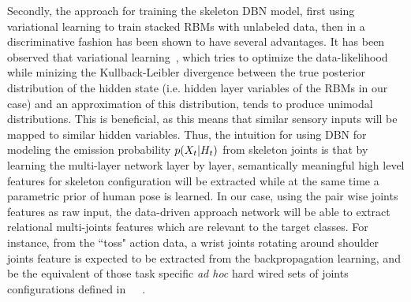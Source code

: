 Secondly, the approach for training the skeleton DBN model, first using variational learning to train stacked RBMs with unlabeled data, then in a discriminative fashion
\cite{salakhutdinov2009learning} has been shown to have several advantages.
%
It has been observed that  variational learning~\cite{neal1998view},
which tries to optimize the data-likelihood while minizing the Kullback-Leibler divergence between
the true posterior distribution of the hidden state (i.e. hidden layer variables of the RBMs  in our case)
and an approximation of this distribution, tends to produce unimodal distributions.
%
This is beneficial, as this means that similar sensory inputs will be mapped to  similar hidden variables.
%
Thus, the intuition for using DBN  for modeling the emission probability $p(X_t|H_t)$
from skeleton joints  is that by learning the multi-layer network layer by layer,
semantically meaningful high level features for skeleton configuration will be extracted while at the same
time a  parametric prior of human pose is learned.
%
%
In our case, using the pair wise joints features as raw input, the data-driven approach network will be able to extract relational
multi-joints features which are relevant to the target classes.
For instance, from  the ``toss" action data, a wrist joints rotating around shoulder joints feature is expected to
be extracted from the backpropagation  learning, and be the equivalent of those task specific \emph{ad hoc} hard wired sets
of joints configurations defined in~\cite{chaudhry2013bio}~\cite{muller2006motion}\cite{nowozin2012action}~\cite{ofli2013sequence}.

